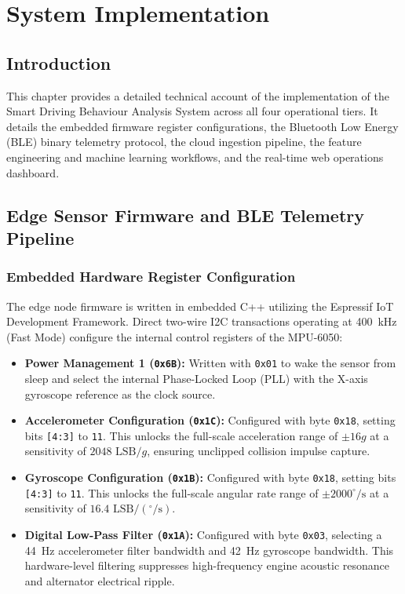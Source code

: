 \chapter{System Implementation}
\label{chap:implementation}

\section{Introduction}
\label{sec:impl_intro}
This chapter provides a detailed technical account of the implementation of the Smart Driving Behaviour Analysis System across all four operational tiers. It details the embedded firmware register configurations, the Bluetooth Low Energy (BLE) binary telemetry protocol, the cloud ingestion pipeline, the feature engineering and machine learning workflows, and the real-time web operations dashboard.

\section{Edge Sensor Firmware and BLE Telemetry Pipeline}
\label{sec:impl_edge}

\subsection{Embedded Hardware Register Configuration}
The edge node firmware is written in embedded C++ utilizing the Espressif IoT Development Framework. Direct two-wire I2C transactions operating at 400~kHz (Fast Mode) configure the internal control registers of the MPU-6050:
\begin{itemize}
    \item \textbf{Power Management 1 (\texttt{0x6B}):} Written with \texttt{0x01} to wake the sensor from sleep and select the internal Phase-Locked Loop (PLL) with the X-axis gyroscope reference as the clock source.
    \item \textbf{Accelerometer Configuration (\texttt{0x1C}):} Configured with byte \texttt{0x18}, setting bits \texttt{[4:3]} to \texttt{11}. This unlocks the full-scale acceleration range of $\pm 16g$ at a sensitivity of $2048\text{ LSB}/g$, ensuring unclipped collision impulse capture.
    \item \textbf{Gyroscope Configuration (\texttt{0x1B}):} Configured with byte \texttt{0x18}, setting bits \texttt{[4:3]} to \texttt{11}. This unlocks the full-scale angular rate range of $\pm 2000^\circ/\text{s}$ at a sensitivity of $16.4\text{ LSB}/(^\circ/\text{s})$.
    \item \textbf{Digital Low-Pass Filter (\texttt{0x1A}):} Configured with byte \texttt{0x03}, selecting a 44~Hz accelerometer filter bandwidth and 42~Hz gyroscope bandwidth. This hardware-level filtering suppresses high-frequency engine acoustic resonance and alternator electrical ripple.
\end{itemize}

